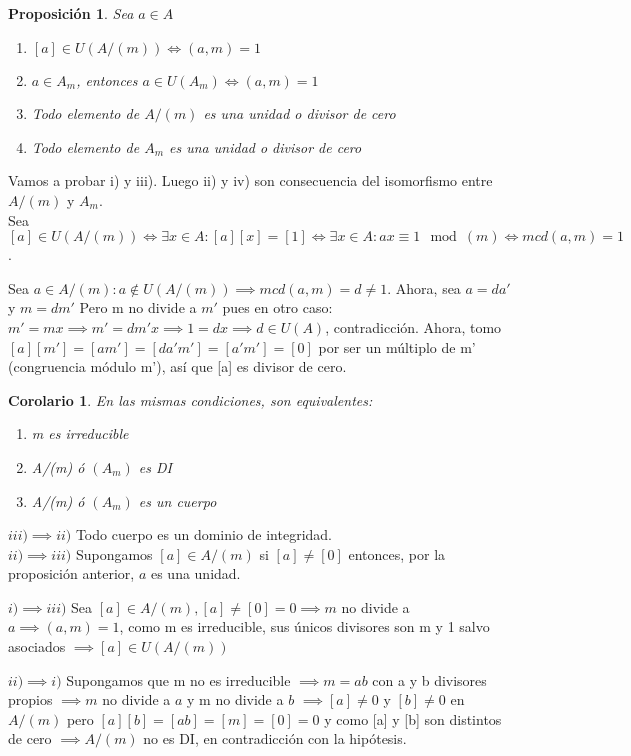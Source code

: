 \documentclass[11pt, a4paper, titlepage]{article}
\makeatletter
\renewenvironment{proof}[1][\proofname] {\vspace{-15pt}\par\pushQED{\qed}\normalfont\topsep6\p@\@plus6\p@\relax\trivlist\item[\hskip\labelsep\it#1\@addpunct{.}]\ignorespaces}{\popQED\endtrivlist\@endpefalse}
\theoremstyle{theorem-style}
\newtheorem*{nprop}{Proposición}
\newtheorem{ncor}{Corolario}
\theoremstyle{definition-style}
\theoremstyle{remark-style}
\theoremstyle{example-style}
\newenvironment{nlist}
{\begin{enumerate}
\renewcommand\labelenumi{(\emph{\roman{enumi})}}}
{\end{enumerate}}
\makeatother
\begin{document}
\begin{nprop} Sea $a \in A$
	\begin{nlist}
	\item $[a] \in U(A/(m)) \iff (a,m) = 1 $
	\item $a \in A_m$, entonces $a \in U(A_m) \iff (a,m) = 1$
	\item Todo elemento de $A/(m)$ es una unidad o divisor de cero
	\item Todo elemento de $A_m$ es una unidad o divisor de cero
\end{nlist}
\end{nprop}
\begin{proof}
	Vamos a probar i) y iii). Luego ii) y iv) son consecuencia del isomorfismo entre $A/(m)$ y $A_m$.\\
	Sea $[a] \in U(A/(m)) \iff \exists x \in A: [a][x] = [1] \iff \exists x \in A : ax \equiv 1\mod(m) \iff mcd(a,m) = 1$.
	
	Sea $a \in A/(m) : a \notin U(A/(m)) \implies mcd(a,m) = d \ne 1$. Ahora, sea $a = da'$ y $m=dm'$
	Pero m no divide a $m'$ pues en otro caso: $m'=mx \implies m' = dm'x \implies 1 = dx \implies d \in U(A)$, contradicción.
	Ahora, tomo $[a][m'] = [am'] = [da'm'] = [a'm'] = [0]$ por ser un múltiplo de m' (congruencia módulo m'), así que [a] es divisor de cero.
\end{proof}

\begin{ncor}
	En las mismas condiciones, son equivalentes:
	
	\begin{nlist}
	\item m es irreducible
	\item A/(m) ó $(A_m)$ es DI
	\item A/(m) ó $(A_m)$ es un cuerpo
\end{nlist}
\end{ncor}
\begin{proof}
	$\boxed{iii) \implies ii)}$ Todo cuerpo es un dominio de integridad.\\
	$\boxed{ii) \implies iii)}$ Supongamos $[a] \in A/(m) $ si $[a] \ne [0]$ entonces, por la proposición anterior, $a$ es una unidad.
	
	$\boxed{i) \implies iii)}$ Sea $[a] \in A/(m), [a] \ne [0] = 0 \implies m$ no divide a $a \implies (a,m) = 1$, como m es irreducible, sus únicos divisores son m y 1 salvo asociados $\implies [a] \in U(A/(m))$
	
	$\boxed{ii)\implies i)}$ Supongamos que m no es irreducible $\implies m = ab$ con a y b divisores propios $\implies m$ no divide a $a$ y m no divide a $b$ $\implies [a] \ne 0 $ y $[b] \ne 0$ en $A/(m)$ pero $[a][b] = [ab] = [m] = [0] = 0$ y como [a] y [b] son distintos de cero $\implies A/(m)$ no es DI, en contradicción con la hipótesis.
\end{proof}
\end{document}
